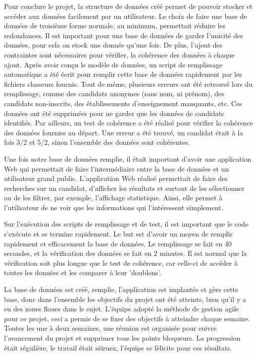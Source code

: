 \documentclass[12pt]{article}
\begin{document}
    Pour conclure le projet, la structure de données créé permet de pouvoir stocker et accéder aux données facilement par un utilisateur. Le choix de faire une base de données de troisième forme normale, au minimum, permettait réduire les redondances. Il est important pour une base de données de garder l'unicité des données, pour cela on stock une donnée qu'une fois. De plus, l'ajout des contraintes sont nécessaires pour vérifier, la cohérence des données à chaque ajout. Après avoir conçu le modèle de données, un script de remplissage automatique a été écrit pour remplir cette base de données rapidement par les fichiers classeurs fournis. Tout de même, plusieurs erreurs ont été retrouvé lors du remplissage, comme des candidats anonymes (sans nom, ni prénom), des candidats non-inscrits, des établissements d'enseignement manquants, etc. Ces données ont été supprimées pour ne garder que les données de candidats identifiés. Par ailleurs, un test de cohérence a été réalisé pour vérifier la cohérence des données fournies au départ. Une erreur a été trouvé, un candidat était à la fois 3/2 et 5/2, sinon l'ensemble des données sont cohérentes.
    
    Une fois notre base de données remplie, il était important d'avoir une application Web qui permettait de faire l'intermédiaire entre la base de données et un utilisateur grand public. L'application Web réalisé permettait de faire des recherches sur un candidat, d'afficher les résultats et surtout de les sélectionner ou de les filtrer, par exemple, l'affichage statistique. Ainsi, elle permet à l'utilisateur de ne voir que les informations qui l'intéressent simplement. 
    
    Sur l'exécution des scripts de remplissage et de test, il est important que le code s'exécute et se termine rapidement. Le but est d'avoir un moyen de remplir rapidement et efficacement la base de données. Le remplissage se fait en 40 secondes, et la vérification des données se fait en 2 minutes. Il est normal que la vérification soit plus longue que le test de cohérence, car celle-ci de accéder à toutes les données et les comparer à leur 'doublons'. 
    
    La base de données est créé, remplie, l'application est implantée et gère cette base, donc dans l'ensemble les objectifs du projet ont été atteints, bien qu'il y a eu des zones floues dans le sujet. L'équipe adopté la méthode de gestion agile pour ce projet, ceci a permis de se fixer des objectifs à atteindre chaque semaine. Toutes les une à deux semaines, une réunion est organisée pour suivre l'avancement du projet et supprimer tous les points bloqueurs. La progression était régulière, le travail était séiruex, l'équipe se félicite pour ces résultats.
    
\end{document}
